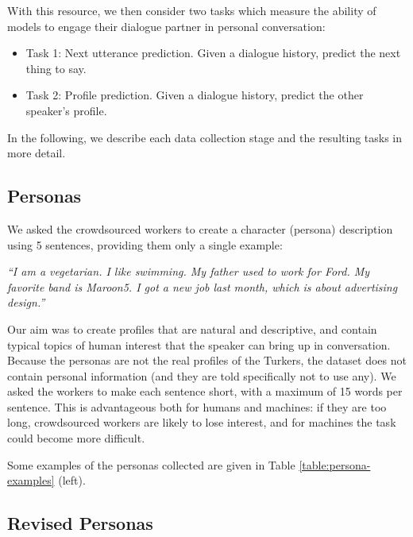 With this resource, we then consider two tasks which measure the ability of models to engage their dialogue partner in personal conversation:
\begin{itemize}
\item Task 1: Next utterance prediction. Given a dialogue history, predict the next thing to say.  %
\item Task 2: Profile prediction. Given a dialogue history, predict the other speaker's profile.
\end{itemize}

In the following, we describe each data collection stage and the resulting tasks in more detail.
\fi 





\subsection{Personas}

We asked the crowdsourced workers to create a character (persona) description using 5 sentences, providing them only a single example:

{\em ``I am a vegetarian. I like swimming.  My father used to work for Ford.  My favorite band is Maroon5. I got a new job last month, which is about advertising design.''}

Our aim was to create profiles that are natural and descriptive, and contain typical topics of human interest that the speaker 
can bring up in conversation. Because the personas are not the real profiles of the Turkers,
  the dataset does not contain personal information (and they are told specifically not to use any).
We asked the workers to make each sentence short, with a maximum of 15 words per sentence.
This is advantageous both for humans and machines: if they are too long, crowdsourced workers are likely to lose interest, and for machines the task could become more difficult.

Some examples of the  personas collected are given in Table \ref{table:persona-examples} (left).

\subsection{Revised Personas}

